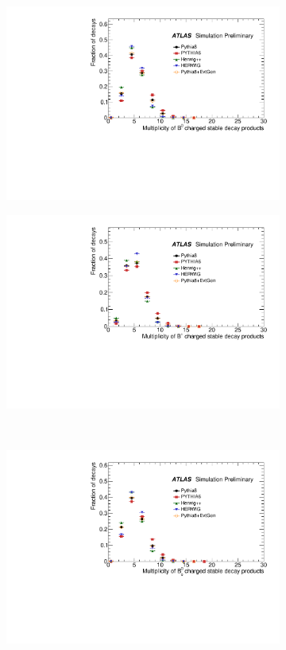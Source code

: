 \begin{figure}
\centering
\begin{subfigure}[]{0.45\textwidth}
\includegraphics[width=\textwidth]{evtgen/figures/EvtGen/B0/h_species_ncharge.pdf}
\end{subfigure}
\begin{subfigure}[]{0.45\textwidth}
\includegraphics[width=\textwidth]{evtgen/figures/EvtGen/B+/h_species_ncharge.pdf}
\end{subfigure}\\
\begin{subfigure}[]{0.45\textwidth}
\includegraphics[width=\textwidth]{evtgen/figures/EvtGen/Bs0/h_species_ncharge.pdf}

\end{subfigure}
\end{figure}
